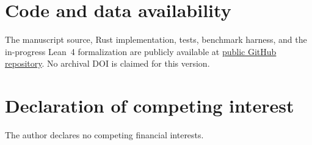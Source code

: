\documentclass[preprint,3p,12pt,numbers]{elsarticle}
\theoremstyle{definition}
\theoremstyle{remark}
\begin{document}
\section*{Code and data availability}

The manuscript source, Rust implementation, tests, benchmark harness, and
the in-progress Lean~4 formalization are publicly available at
\href{https://github.com/qoosmo/kernel-basis-filtration}{public GitHub repository}. No archival DOI
is claimed for this version.

\section*{Declaration of competing interest}
The author declares no competing financial interests.



\end{document}

